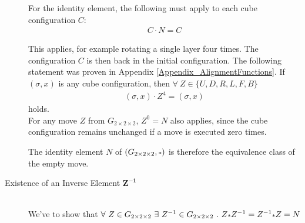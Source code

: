 \documentclass[12pt,a4paper]{article}
\theoremstyle{custom}
\newcommand{\Gtwo}{\ensuremath{G_{2\times 2\times 2}}}
\begin{document}
\begin{description}
For the identity element, the following must apply to each cube configuration $C$:
\begin{align*}
C \cdot N = C
\end{align*}

This applies, for example rotating a single layer four times. The configuration $C$ is then back in the initial configuration. The following statement was proven in Appendix \ref{Appendix_AlignmentFunctions}. If $(\sigma, x)$ is any cube configuration, then $\forall \ Z \in \{U, D, R, L, F, B\} $
\begin{align*}
(\sigma, x) \cdot Z^4 = (\sigma, x)  
\end{align*}
holds. \\
For any move $Z$ from $\Gtwo$, $Z^0=N$ also applies, since the cube configuration remains unchanged if a move is executed zero times.

The identity element $N$ of $(\Gtwo, \mathlarger{\scriptstyle*})$ is therefore the equivalence class of the empty move.


\item [Existence of an Inverse Element $\boldsymbol{Z^{-1}}$] \ \\
We've to show that $\forall \ Z \in \Gtwo \ \exists \ Z^{-1} \in \Gtwo \ . \ Z \mathlarger{\scriptstyle*} Z^{-1} = Z^{-1} \mathlarger{\scriptstyle*} Z = N$



\end{description}
\end{document}
